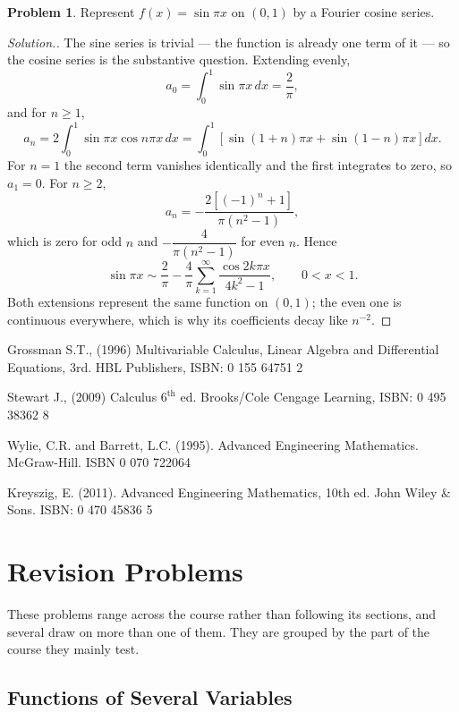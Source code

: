 \documentclass[11pt,a4paper]{article}
\theoremstyle{definition}
\newtheorem{problemx}{Problem}[subsection]
\newenvironment{problem}{\begin{problemx}}{\end{problemx}}
\newenvironment{solution}
  {\renewcommand{\qedsymbol}{}\begin{proof}[\textit{Solution}.]}
  {\end{proof}}
\begin{document}
\begin{problem}
Represent $f(x) = \sin\pi x$ on $(0,1)$ by a Fourier cosine series.
\end{problem}
\begin{solution}
The sine series is trivial --- the function is already one term of it --- so the
cosine series is the substantive question. Extending evenly,
\[a_0 = \int_0^1\sin\pi x\,dx = \frac{2}{\pi},\]
and for $n\geq 1$,
\[a_n = 2\int_0^1\sin\pi x\cos n\pi x\,dx
= \int_0^1[\sin(1+n)\pi x + \sin(1-n)\pi x]dx .\]
For $n=1$ the second term vanishes identically and the first integrates to
zero, so $a_1 = 0$. For $n\geq 2$,
\[a_n = -\frac{2[(-1)^n+1]}{\pi(n^2-1)},\]
which is zero for odd $n$ and $-\dfrac{4}{\pi(n^2-1)}$ for even $n$.
Hence
\[\sin\pi x \sim \frac{2}{\pi}
- \frac{4}{\pi}\sum_{k=1}^{\infty}\frac{\cos 2k\pi x}{4k^2-1},
\qquad 0<x<1 .\]
Both extensions represent the same function on $(0,1)$; the even one is
continuous everywhere, which is why its coefficients decay like $n^{-2}$.
\end{solution}


\begin{thebibliography}{}

Grossman S.T., (1996) Multivariable Calculus, Linear Algebra and Differential Equations, 3rd. HBL Publishers, ISBN: 0 155 64751 2

Stewart J., (2009) Calculus $6^{\text{th}}$ ed. Brooks/Cole Cengage Learning, ISBN: 0 495 38362 8

Wylie, C.R. and Barrett, L.C. (1995). Advanced Engineering Mathematics. McGraw-Hill. ISBN 0 070 722064

Kreyszig, E. (2011). Advanced Engineering Mathematics, 10th ed. John Wiley \& Sons. ISBN: 0 470 45836 5

\end{thebibliography}

\pagebreak

\section{Revision Problems}

These problems range across the course rather than following its sections, and
several draw on more than one of them. They are grouped by the part of the
course they mainly test.

\subsection{Functions of Several Variables}
\end{document}

